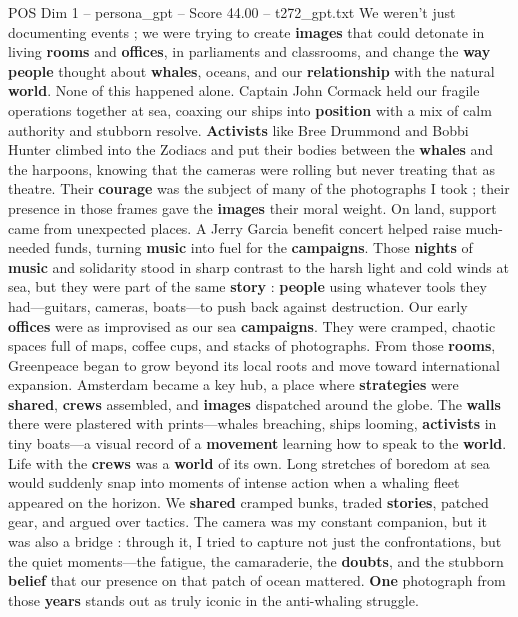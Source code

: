 \begin{textsample}{POS Dim 1 – persona\_gpt – Score 44.00 – t272\_gpt.txt}
We weren't just documenting events ; we were trying to create \textbf{images} that could detonate in living \textbf{rooms} and \textbf{offices}, in parliaments and classrooms, and change the \textbf{way} \textbf{people} thought about \textbf{whales}, oceans, and our \textbf{relationship} with the natural \textbf{world}.
None of this happened alone.
Captain John Cormack held our fragile operations together at sea, coaxing our ships into \textbf{position} with a mix of calm authority and stubborn resolve. \textbf{Activists} like Bree Drummond and Bobbi Hunter climbed into the Zodiacs and put their bodies between the \textbf{whales} and the harpoons, knowing that the cameras were rolling but never treating that as theatre.
Their \textbf{courage} was the subject of many of the photographs I took ; their presence in those frames gave the \textbf{images} their moral weight.
On land, support came from unexpected places.
A Jerry Garcia benefit concert helped raise much-needed funds, turning \textbf{music} into fuel for the \textbf{campaigns}.
Those \textbf{nights} of \textbf{music} and solidarity stood in sharp contrast to the harsh light and cold winds at sea, but they were part of the same \textbf{story} : \textbf{people} using whatever tools they had—guitars, cameras, boats—to push back against destruction.
Our early \textbf{offices} were as improvised as our sea \textbf{campaigns}.
They were cramped, chaotic spaces full of maps, coffee cups, and stacks of photographs.
From those \textbf{rooms}, Greenpeace began to grow beyond its local roots and move toward international expansion.
Amsterdam became a key hub, a place where \textbf{strategies} were \textbf{shared}, \textbf{crews} assembled, and \textbf{images} dispatched around the globe.
The \textbf{walls} there were plastered with prints—whales breaching, ships looming, \textbf{activists} in tiny boats—a visual record of a \textbf{movement} learning how to speak to the \textbf{world}.
Life with the \textbf{crews} was a \textbf{world} of its own.
Long stretches of boredom at sea would suddenly snap into moments of intense action when a whaling fleet appeared on the horizon.
We \textbf{shared} cramped bunks, traded \textbf{stories}, patched gear, and argued over tactics.
The camera was my constant companion, but it was also a bridge : through it, I tried to capture not just the confrontations, but the quiet moments—the fatigue, the camaraderie, the \textbf{doubts}, and the stubborn \textbf{belief} that our presence on that patch of ocean mattered. \textbf{One} photograph from those \textbf{years} stands out as truly iconic in the anti-whaling struggle.

\end{textsample}
